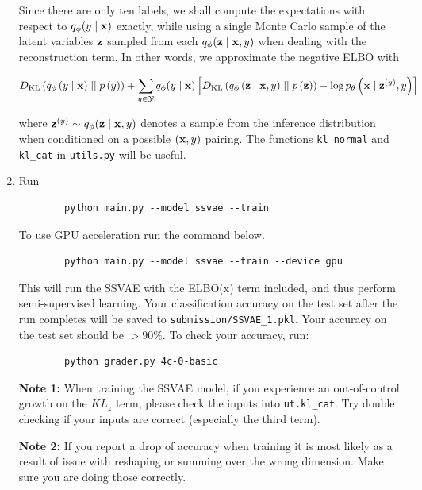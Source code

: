 \begin{enumerate}[label=(\alph*)]
    Since there are only ten labels, we shall compute the expectations with respect to $q_{\phi}(y \mid \mathbf{x})$ exactly, while 
    using a single Monte Carlo sample of the latent variables $\mathbf{z}$ sampled from each $q_{\phi}(\mathbf{z} \mid \mathbf{x},y)$ when dealing 
    with the reconstruction term. In other words, we approximate the negative ELBO with

    \begin{equation} \label{eq:30}
        D_{\text{KL}}\left(q_{\phi}\left(y \mid \mathbf{x}\right) \mid\mid p\left(y\right)\right) + \sum\limits_{y \in \mathcal{Y}} q_{\phi}(y \mid \mathbf{x}) \left[D_{\text{KL}}\left(q_{\phi}\left(\mathbf{z} \mid \mathbf{x}, y\right) \mid\mid p\left(\mathbf{z}\right)\right) - \log p_{\theta}\left(\mathbf{x} \mid \mathbf{z}^{(y)}, y\right)\right]
    \end{equation}

    where $\mathbf{z}^{(y)} \sim q_{\phi}(\mathbf{z} \mid \mathbf{x}, y)$ denotes a sample from the inference distribution when conditioned on a possible
    $(\mathbf{x}, y)$ pairing. The functions \texttt{kl\_normal} and \texttt{kl\_cat} in \texttt{utils.py} will be useful.

    \item {} Run 
    \begin{verbatim}
        python main.py --model ssvae --train
    \end{verbatim}

    To use GPU acceleration run the command below.
    \begin{verbatim}
        python main.py --model ssvae --train --device gpu
    \end{verbatim}

    This will run the SSVAE with the ELBO(x) term included, and thus perform 
    semi-supervised learning. Your classification accuracy on the test set after the run completes will be saved to \texttt{submission/SSVAE\_1.pkl}. Your accuracy on the test set should be $> 90\%$.
    To check your accuracy, run:
    \begin{verbatim}
        python grader.py 4c-0-basic
    \end{verbatim}

    \textbf{Note 1: }When training the SSVAE model, if you experience an out-of-control growth on the $KL_{z}$ term,
    please check the inputs into \texttt{ut.kl\_cat}. Try double checking if your inputs are correct (especially the third term). 

    \textbf{Note 2: }If you report a drop of accuracy when training it is most likely as a result of issue with reshaping or summing over the wrong dimension. Make sure you are doing those correctly.
\end{enumerate}